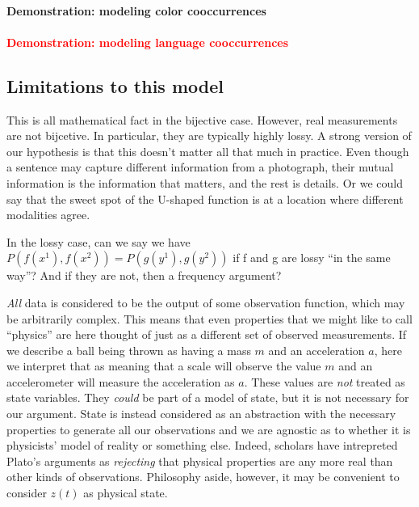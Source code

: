 \paragraph{Demonstration: modeling color cooccurrences}


\paragraph{\textcolor{red}{Demonstration: modeling language cooccurrences}}








\subsection{Limitations to this model}
This is all mathematical fact in the bijective case. However, real measurements are not bijcetive. In particular, they are typically highly lossy. A strong version of our hypothesis is that this doesn't matter all that much in practice. Even though a sentence may capture different information from a photograph, their mutual information is the information that matters, and the rest is details. Or we could say that the sweet spot of the U-shaped function is at a location where different modalities agree.

In the lossy case, can we say we have $P(f(x^1), f(x^2)) = P(g(y^1), g(y^2))$ if f and g are lossy ``in the same way''? And if they are not, then a frequency argument?



\textit{All} data is considered to be the output of some observation function, which may be arbitrarily complex. This means that even properties that we might like to call ``physics'' are here thought of just as a different set of observed measurements. If we describe a ball being thrown as having a mass $m$ and an acceleration $a$, here we interpret that as meaning that a scale will observe the value $m$ and an accelerometer will measure the acceleration as $a$. These values are \textit{not} treated as state variables. They \textit{could} be part of a model of state, but it is not necessary for our argument. State is instead considered as an abstraction with the necessary properties to generate all our observations and we are agnostic as to whether it is physicists' model of reality or something else. Indeed, scholars have intrepreted Plato's arguments as \textit{rejecting} that physical properties are any more real than other kinds of observations. Philosophy aside, however, it may be convenient to consider $z(t)$ as physical state.


